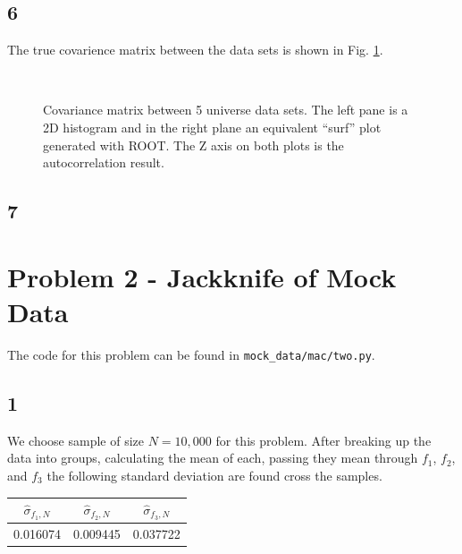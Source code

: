 \documentclass[singlepage,notitlepage,nofootinbib,11pt]{revtex4-1}
\begin{document}
\subsection{6}
The true covarience matrix between the data sets is shown in Fig. \ref{comatrix}.
\begin{figure}[h]
\centering
  \captionsetup[subfigure]{labelformat=empty}
  \\
\caption{\label{comatrix} Covariance matrix between 5 universe data sets. The left pane is a 2D histogram and in the right plane an equivalent ``surf'' plot generated with ROOT. The Z axis on both plots is the autocorrelation result.}
\end{figure}
\clearpage
\subsection{7}

\section{Problem 2 - Jackknife of Mock Data}
\begin{center}The code for this problem can be found in \verb|mock_data/mac/two.py|. \end{center}
\subsection{1}
We choose sample of size $N=10,000$ for this problem. After breaking up the data into groups, calculating the mean of each, passing they mean through $f_1$, $f_2$, and $f_3$ the following standard deviation are found cross the samples.
\begin{center}
\begin{tabular}{| c | c | c |}
\hline
$\hat{\sigma}_{f_1,N}$ & $\hat{\sigma}_{f_2,N}$ & $\hat{\sigma}_{f_3,N}$ \\ \hline\hline
0.016074 & 0.009445 & 0.037722 \\ \hline 
\end{tabular}
\end{center}
\end{document}
